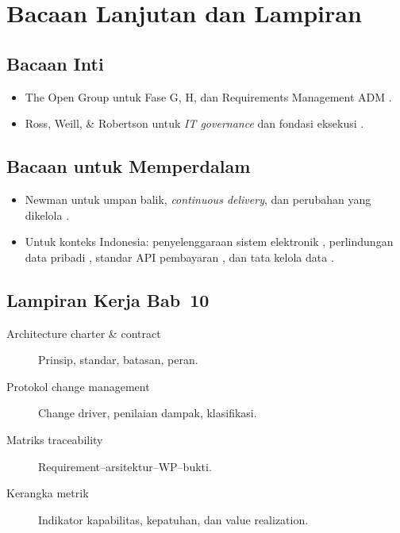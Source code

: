 \section{Bacaan Lanjutan dan Lampiran}

\subsection*{Bacaan Inti}
\begin{itemize}
  \item The Open Group untuk Fase G, H, dan Requirements Management ADM
        \cite{togaf10}.
  \item Ross, Weill, \& Robertson untuk \emph{IT governance} dan fondasi eksekusi
        \cite{ross2006enterprise,ross2019designed}.
\end{itemize}

\subsection*{Bacaan untuk Memperdalam}
\begin{itemize}
  \item Newman untuk umpan balik, \emph{continuous delivery}, dan perubahan yang
        dikelola \cite{newman2021building}.
  \item Untuk konteks Indonesia: penyelenggaraan sistem elektronik \cite{pp712019},
        perlindungan data pribadi \cite{uupdp2022}, standar API pembayaran
        \cite{snapbi}, dan tata kelola data \cite{satudata}.
\end{itemize}

\subsection*{Lampiran Kerja Bab~10}
\begin{description}
  \item[Architecture charter \& contract] Prinsip, standar, batasan, peran.
  \item[Protokol change management] Change driver, penilaian dampak, klasifikasi.
  \item[Matriks traceability] Requirement--arsitektur--WP--bukti.
  \item[Kerangka metrik] Indikator kapabilitas, kepatuhan, dan value realization.
\end{description}
\setlength{\emergencystretch}{0pt}
